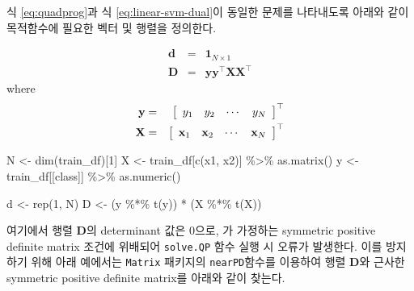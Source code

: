 \documentclass[
]{book}
\newenvironment{Shaded}{\begin{snugshade}}{\end{snugshade}}
\newcommand{\DecValTok}[1]{\textcolor[rgb]{0.00,0.00,0.81}{#1}}
\newcommand{\FunctionTok}[1]{\textcolor[rgb]{0.00,0.00,0.00}{#1}}
\newcommand{\NormalTok}[1]{#1}
\newcommand{\OtherTok}[1]{\textcolor[rgb]{0.56,0.35,0.01}{#1}}
\newcommand{\SpecialCharTok}[1]{\textcolor[rgb]{0.00,0.00,0.00}{#1}}
\newcommand{\StringTok}[1]{\textcolor[rgb]{0.31,0.60,0.02}{#1}}
\begin{document}
식 \eqref{eq:quadprog}과 식 \eqref{eq:linear-svm-dual}이 동일한 문제를 나타내도록 아래와 같이 목적함수에 필요한 벡터 및 행렬을 정의한다.

\begin{eqnarray*}
\mathbf{d} &=& \mathbf{1}_{N \times 1}\\
\mathbf{D} &=& \mathbf{y}\mathbf{y}^{\top}\mathbf{X}\mathbf{X}^{\top}
\end{eqnarray*}
where
\begin{eqnarray*}
\mathbf{y} &=& \left[ \begin{array}{c c c c} y_1 & y_2 & \cdots & y_N \end{array} \right]^\top\\
\mathbf{X} &=& \left[ \begin{array}{c c c c} \mathbf{x}_1 & \mathbf{x}_2 & \cdots & \mathbf{x}_N \end{array} \right]^{\top}
\end{eqnarray*}

\begin{Shaded}
\begin{Highlighting}[]
\NormalTok{N }\OtherTok{\textless{}{-}} \FunctionTok{dim}\NormalTok{(train\_df)[}\DecValTok{1}\NormalTok{]}
\NormalTok{X }\OtherTok{\textless{}{-}}\NormalTok{ train\_df[}\FunctionTok{c}\NormalTok{(}\StringTok{\textquotesingle{}x1\textquotesingle{}}\NormalTok{, }\StringTok{\textquotesingle{}x2\textquotesingle{}}\NormalTok{)] }\SpecialCharTok{\%\textgreater{}\%} \FunctionTok{as.matrix}\NormalTok{()}
\NormalTok{y }\OtherTok{\textless{}{-}}\NormalTok{ train\_df[[}\StringTok{\textquotesingle{}class\textquotesingle{}}\NormalTok{]] }\SpecialCharTok{\%\textgreater{}\%} \FunctionTok{as.numeric}\NormalTok{()}

\NormalTok{d }\OtherTok{\textless{}{-}} \FunctionTok{rep}\NormalTok{(}\DecValTok{1}\NormalTok{, N)}
\NormalTok{D }\OtherTok{\textless{}{-}}\NormalTok{ (y }\SpecialCharTok{\%*\%} \FunctionTok{t}\NormalTok{(y)) }\SpecialCharTok{*}\NormalTok{ (X }\SpecialCharTok{\%*\%} \FunctionTok{t}\NormalTok{(X))}
\end{Highlighting}
\end{Shaded}

여기에서 행렬 \(\mathbf{D}\)의 determinant 값은 0으로, \citet{goldfarb1983numerically} 가 가정하는 symmetric positive definite matrix 조건에 위배되어 \texttt{solve.QP} 함수 실행 시 오류가 발생한다. 이를 방지하기 위해 아래 예에서는 \texttt{Matrix} 패키지의 \texttt{nearPD}함수를 이용하여 행렬 \(\mathbf{D}\)와 근사한 symmetric positive definite matrix를 아래와 같이 찾는다.
\end{document}
